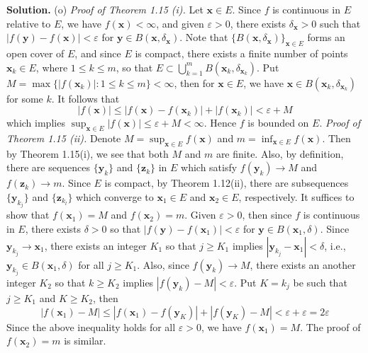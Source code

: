\documentclass[12pt]{article}
\theoremstyle{definition}
\begin{document}
\smallskip
\noindent\textbf{Solution.}\quad
(o) \textit{Proof of Theorem 1.15 (i).} Let $\mathbf{x}\in E$. Since $f$ is continuous in $E$ relative to $E$, we have  $f(\mathbf{x})<\infty$, and given $\varepsilon>0$, there exists $\delta_{\mathbf{x}}>0$ such that $\left\vert f(\mathbf{y})-f(\mathbf{x})\right\vert<\varepsilon$ for $\mathbf{y}\in B(\mathbf{x},\delta_{\mathbf{x}})$. Note that $\{B(\mathbf{x},\delta_{\mathbf{x}})\}_{\mathbf{x}\in E}$ forms an open cover of $E$, and since $E$ is compact, there exists a finite number of points $\mathbf{x}_k\in E$, where $1\le k\le m$, so that $E\subset \bigcup_{k=1}^mB(\mathbf{x}_k,\delta_{\mathbf{x}_k})$. Put $M=\max\{\left\vert f(\mathbf{x}_k)\right\vert:1\le k\le m\}<\infty$, then for $\mathbf{x}\in E$, we have $\mathbf{x}\in B(\mathbf{x}_k,\delta_{\mathbf{x}_k})$ for some $k$. It follows that
$$
\left\vert f(\mathbf{x})\right\vert
\le \left\vert f(\mathbf{x})-f(\mathbf{x}_k)\right\vert+\left\vert f(\mathbf{x}_k)\right\vert
<\varepsilon+M
$$
which implies $\sup_{\mathbf{x}\in E}\left\vert f(\mathbf{x})\right\vert\le \varepsilon+M<\infty$. Hence $f$ is bounded on $E$.
\textit{Proof of Theorem 1.15 (ii).} Denote $M=\sup_{\mathbf{x}\in E}f(\mathbf{x})$ and $m=\inf_{\mathbf{x}\in E}f(\mathbf{x})$. Then by Theorem 1.15(i), we see that both $M$ and $m$ are finite. Also, by definition, there are sequences $\{\mathbf{y}_k\}$ and $\{\mathbf{z}_k\}$ in $E$ which satisfy $f(\mathbf{y}_k)\to M$ and $f(\mathbf{z}_k)\to m$. Since $E$ is compact, by Theorem 1.12(ii), there are subsequences $\{\mathbf{y}_{k_j}\}$ and $\{\mathbf{z}_{k_l}\}$ which converge to $\mathbf{x}_1\in E$ and $\mathbf{x}_2\in E$, respectively. It suffices to show that $f(\mathbf{x}_1)=M$ and $f(\mathbf{x}_2)=m$. Given $\varepsilon>0$, then since $f$ is continuous in $E$, there exists $\delta>0$ so that $\left\vert f(\mathbf{y})-f(\mathbf{x}_1)\right\vert<\varepsilon$ for $\mathbf{y}\in B(\mathbf{x}_1,\delta)$. Since $\mathbf{y}_{k_j}\to\mathbf{x}_1$, there exists an integer $K_1$ so that $j\ge K_1$ implies $\left\vert\mathbf{y}_{k_j}-\mathbf{x}_1\right\vert<\delta$, i.e., $\mathbf{y}_{k_j}\in B(\mathbf{x}_1,\delta)$ for all $j\ge K_1$. Also, since $f(\mathbf{y}_k)\to M$, there exists an another integer $K_2$ so that $k\ge K_2$ implies $\left\vert f(\mathbf{y}_{k})-M\right\vert<\varepsilon$. Put $K=k_j$ be such that $j\ge K_1$ and $K\ge K_2$, then
$$
\left\vert f(\mathbf{x}_1)-M\right\vert
\le \left\vert f(\mathbf{x}_1)-f(\mathbf{y}_K)\right\vert+\left\vert f(\mathbf{y}_K)-M\right\vert
<\varepsilon+\varepsilon
=2\varepsilon
$$
Since the above inequality holds for all $\varepsilon>0$, we have $f(\mathbf{x}_1)=M$. The proof of $f(\mathbf{x}_2)=m$ is similar.
\end{document}
